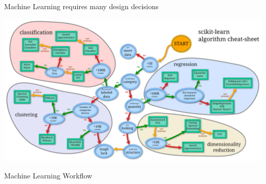 \begin{frame}[c]{Machine Learning requires many design decisions}

\includegraphics[width=1.0\textwidth]{images/sklearn-cheat}

\end{frame}
\begin{frame}[c]{Machine Learning Workflow}

\centering


\pause
 
\bigskip
\bigskip
{}

\end{frame}
